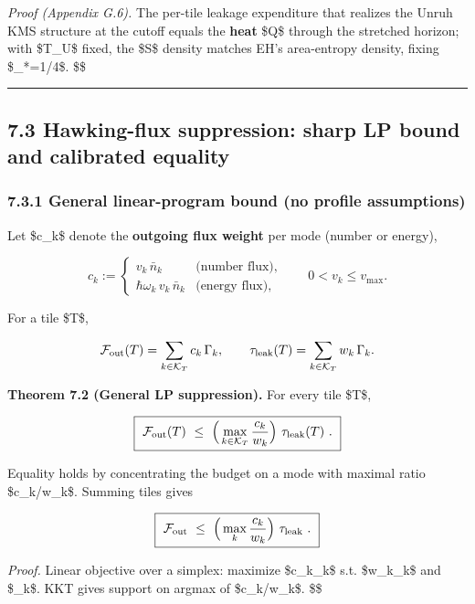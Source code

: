 \documentclass[
]{article}
\numberwithin{equation}{section}
\begin{document}
\emph{Proof (Appendix G.6).} The per-tile leakage expenditure that
realizes the Unruh KMS structure at the cutoff equals the \textbf{heat}
\$\delta Q\$ through the stretched horizon; with \$T\_U\$ fixed, the
\$\delta S\$ density matches EH's area-entropy density, fixing
\$\chi\_*=1/4\$. \$\square\$

\begin{center}\rule{0.5\linewidth}{0.5pt}\end{center}

\hypertarget{hawking-flux-suppression-sharp-lp-bound-and-calibrated-equality}{%
\subsection{7.3 Hawking-flux suppression: sharp LP bound and calibrated
equality}\label{hawking-flux-suppression-sharp-lp-bound-and-calibrated-equality}}

\hypertarget{general-linear-program-bound-no-profile-assumptions}{%
\subsubsection{7.3.1 General linear-program bound (no profile
assumptions)}\label{general-linear-program-bound-no-profile-assumptions}}

Let \$c\_k\$ denote the \textbf{outgoing flux weight} per mode (number
or energy),

\[
c_k:=\begin{cases}
v_k\,\bar n_k & \text{(number flux)},\\[2pt]
\hbar\omega_k\,v_k\,\bar n_k & \text{(energy flux)},
\end{cases}
\qquad 0<v_k\le v_{\max}.
\]

For a tile \$T\$,

\[
\mathcal F_{\rm out}(T)=\sum_{k\in\mathcal K_T} c_k\,\Gamma_k,\qquad 
\tau_{\rm leak}(T)=\sum_{k\in\mathcal K_T} w_k\,\Gamma_k.
\]

\textbf{Theorem 7.2 (General LP suppression).} For every tile \$T\$,

\[
\boxed{\
\mathcal F_{\rm out}(T)\ \le\ \Big(\max_{k\in\mathcal K_T}\frac{c_k}{w_k}\Big)\ \tau_{\rm leak}(T)\ .
\ }
\]

Equality holds by concentrating the budget on a mode with maximal ratio
\$c\_k/w\_k\$. Summing tiles gives

\[
\boxed{\
\mathcal F_{\rm out}\ \le\ \Big(\max_{k}\frac{c_k}{w_k}\Big)\ \tau_{\rm leak}\ .
\ }
\]

\emph{Proof.} Linear objective over a simplex: maximize
\$\sum c\_k\Gamma\_k\$ s.t. \$\sum w\_k\Gamma\_k\le\tau\$ and
\$\Gamma\_k\ge0\$. KKT gives support on argmax of \$c\_k/w\_k\$.
\$\square\$
\end{document}
